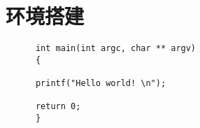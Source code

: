 \documentclass{article}
\begin{document}
\section{环境搭建}
    \begin{lstlisting}
      int main(int argc, char ** argv) 
      { 
      
      printf("Hello world! \n"); 
      
      return 0; 
      } 
    \end{lstlisting}
\end{document}
